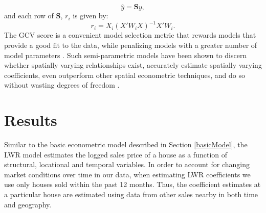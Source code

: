 \documentclass{article}\usepackage{graphicx, color}
\begin{document}
                   \begin{equation*}
                   \hat{y}=\textbf{S}y,
                   \end{equation*}
                   and each row of \textbf{S}, $r_i$ is given by:
                     \begin{equation*}
                   r_i=X_i(X'W_iX)^{-1}X'W_i.
                   \end{equation*}
The GCV score is a convenient model selection metric that rewards models that provide a good fit to the data, while penalizing models with a greater number of model parameters \citep{Loader1999, McMillen2010}. Such semi-parametric models have been shown to discern whether spatially varying relationships exist, accurately estimate spatially varying coefficients, even outperform other spatial econometric techniques, and do so without wasting degrees of freedom \citep{Paez2011, McMillen2010, McMillen2012}. 


\section{Results}
Similar to the basic econometric model described in Section \ref{basicModel}, the LWR model estimates the logged sales price of a house as a function of structural, locational and temporal variables. In order to account for changing market conditions over time in our data, when estimating LWR coefficients we use only houses sold within the past 12 months. Thus, the coefficient estimates at a particular house are estimated using data from other sales nearby in both time and geography.
\end{document}
